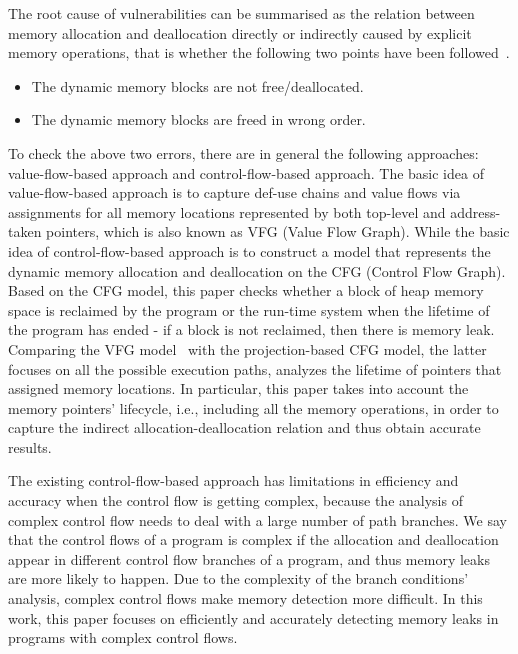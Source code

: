 The root cause of vulnerabilities can be summarised as the relation between memory allocation and deallocation directly or indirectly caused by explicit memory operations, that is whether the following two points have been followed~\cite{AJ06}.
\begin{itemize}
\item	The dynamic memory blocks are not free/deallocated.
\item	The dynamic memory blocks are freed in wrong order.
\end{itemize}
To check the above two errors, there are in general the following approaches: value-flow-based approach and control-flow-based approach. The basic idea of value-flow-based approach is to capture def-use chains and value flows via assignments for all memory locations represented by both top-level and address-taken pointers, which is also known as VFG (Value Flow Graph). While the basic idea of control-flow-based approach is to construct a model that represents the dynamic memory allocation and deallocation on the CFG (Control Flow Graph). Based on the CFG model, this paper checks whether a block of heap memory space is reclaimed by the program or the run-time system when the lifetime of the program has ended - if a block is not reclaimed, then there is memory leak. Comparing the VFG model~\cite{SYX12} with the projection-based CFG model, the latter focuses on all the possible execution paths, analyzes the lifetime of pointers that assigned memory locations. %
In particular, this paper takes into account the memory pointers' lifecycle, i.e., including all the memory operations, in order to capture the indirect allocation-deallocation relation and thus obtain accurate results.

The existing control-flow-based approach has limitations in efficiency and accuracy when the control flow is getting complex, because the analysis of complex control flow needs to deal with a large number of path branches. %
We say that the control flows of a program is complex if the allocation and deallocation appear in different control flow branches of a program, and thus memory leaks are more likely to happen. Due to the complexity of the branch conditions' analysis, complex control flows make memory detection more difficult. %
In this work, this paper focuses on efficiently and accurately detecting memory leaks in programs with complex control flows.  


